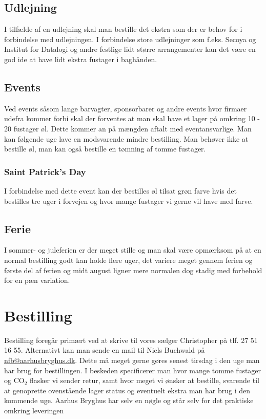 \subsection{Udlejning}

I tilfælde af en udlejning skal man bestille det ekstra som der er behov for i forbindelse med
udlejningen. I forbindelse store udlejninger som f.eks. Secoya og Institut for Datalogi og andre
festlige lidt større arrangementer  kan det være en god ide at have lidt ekstra fustager i baghånden.

\subsection{Events}

Ved events såsom lange barvagter, sponsorbarer og andre events hvor firmaer udefra kommer forbi skal der forventes
at man skal have et lager på omkring 10 - 20 fustager øl. Dette kommer an på mængden aftalt med eventansvarlige. Man kan følgende uge lave en modsvarende mindre bestilling. Man behøver ikke at bestille øl, man kan også bestille en tømning af tomme fustager.

\subsubsection{Saint Patrick's Day}

I forbindelse med dette event kan der bestilles øl tilsat grøn farve hvis det bestilles tre uger i forvejen og hvor mange
fustager vi gerne vil have med farve.

\subsection{Ferie}

I sommer- og juleferien er der meget stille og man skal være opmærksom på at en normal bestilling
godt kan holde flere uger, det variere meget gennem ferien og første del af ferien og
midt august ligner mere normalen dog stadig med forbehold for en pæn variation.


\section{Bestilling}

Bestilling foregår primært ved at skrive til vores sælger Christopher på tlf. 27 51 16 55. Alternativt kan man sende en mail til Niels Buchwald på \\
\href{mailto:nfb@aarhusbryghus.dk}{nfb@aarhusbryghus.dk}. Dette må meget gerne gøres senest tirsdag i den uge man har brug for bestillingen.
I beskeden specificerer man hvor mange tomme fustager og CO$_{2}$ flasker vi sender retur, samt hvor meget vi ønsker at bestille,
svarende til at genoprette ovenstående lager status og eventuelt ekstra man har brug i den kommende uge.
Aarhus Bryghus har selv en nøgle og står selv for det praktiske omkring leveringen


